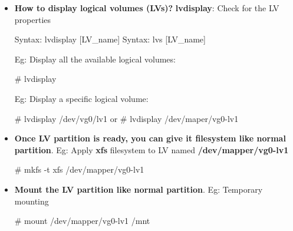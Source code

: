 \begin{flushleft}
\begin{itemize}
	\end{itemize}
	

	\bigskip
	\begin{itemize}
	
	\item 	\textbf{How to display logical volumes (LVs)?}
	\newline
	\textbf{lvdisplay}: Check for the LV properties
	\begin{tcolorbox}[breakable,notitle,boxrule=-0pt,colback=pink,colframe=pink]
		\color{black}
		\font=9pt
		Syntax: lvdisplay [LV\_name]
		\newline
		Syntax: lvs [LV\_name]
		\font=4pt
	\end{tcolorbox}
	
	Eg: Display all the available logical volumes:
	\begin{tcolorbox}[breakable,notitle,boxrule=-0pt,colback=black,colframe=black]
		\color{green}
		\font=9pt
		\# lvdisplay
		\font=4pt
	\end{tcolorbox}
	Eg: Display a specific logical volume:
	\begin{tcolorbox}[breakable,notitle,boxrule=-0pt,colback=black,colframe=black]
		\color{green}
		\font=9pt
		\# lvdisplay /dev/vg0/lv1
		\newline
		or
		\newline
		\# lvdisplay /dev/maper/vg0-lv1
		\font=4pt
	\end{tcolorbox}
	
	\bigskip
	\bigskip	
	
	\item \textbf{Once LV partition is ready, you can give it filesystem like normal partition}.
	\newline
	Eg: Apply \textbf{xfs} filesystem to LV named \textbf{/dev/mapper/vg0-lv1}
	\begin{tcolorbox}[breakable,notitle,boxrule=-0pt,colback=black,colframe=black]
	\color{green}
	\font=9pt
	\# mkfs -t xfs /dev/mapper/vg0-lv1
	\font=4pt
	\end{tcolorbox}
	
	\bigskip
	\bigskip
	
	\item \textbf{Mount the LV partition like normal partition}.
	\newline
	Eg: Temporary mounting
	\begin{tcolorbox}[breakable,notitle,boxrule=-0pt,colback=black,colframe=black]
		\color{green}
		\font=9pt
		\# mount /dev/mapper/vg0-lv1 /mnt
		\font=4pt
	\end{tcolorbox}


\end{itemize}
\end{flushleft}
